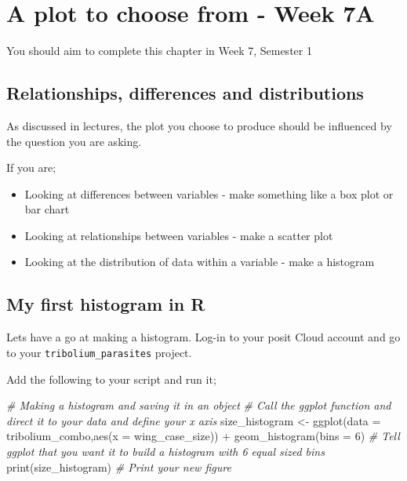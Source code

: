\documentclass[
]{book}
\newenvironment{Shaded}{\begin{snugshade}}{\end{snugshade}}
\newcommand{\AttributeTok}[1]{\textcolor[rgb]{0.77,0.63,0.00}{#1}}
\newcommand{\CommentTok}[1]{\textcolor[rgb]{0.56,0.35,0.01}{\textit{#1}}}
\newcommand{\DecValTok}[1]{\textcolor[rgb]{0.00,0.00,0.81}{#1}}
\newcommand{\FunctionTok}[1]{\textcolor[rgb]{0.00,0.00,0.00}{#1}}
\newcommand{\NormalTok}[1]{#1}
\newcommand{\OtherTok}[1]{\textcolor[rgb]{0.56,0.35,0.01}{#1}}
\newcommand{\SpecialCharTok}[1]{\textcolor[rgb]{0.00,0.00,0.00}{#1}}
\providecommand{\tightlist}{%
  \setlength{\itemsep}{0pt}\setlength{\parskip}{0pt}}
\begin{document}
\hypertarget{histogram}{%
\chapter{A plot to choose from - Week 7A}\label{histogram}}

You should aim to complete this chapter in Week 7, Semester 1

\hypertarget{relationships-differences-and-distributions}{%
\section{Relationships, differences and distributions}\label{relationships-differences-and-distributions}}

As discussed in lectures, the plot you choose to produce should be influenced by the question you are asking.

If you are;

\begin{itemize}
\tightlist
\item
  Looking at differences between variables - make something like a box plot or bar chart
\item
  Looking at relationships between variables - make a scatter plot
\item
  Looking at the distribution of data within a variable - make a histogram
\end{itemize}

\hypertarget{my-first-histogram-in-r}{%
\section{My first histogram in R}\label{my-first-histogram-in-r}}

Lets have a go at making a histogram. Log-in to your posit Cloud account and go to your \texttt{tribolium\_parasites} project.

Add the following to your script and run it;

\begin{Shaded}
\begin{Highlighting}[]
\CommentTok{\# Making a histogram and saving it in an object}
\CommentTok{\# Call the ggplot function and direct it to your data and define your x axis}
\NormalTok{size\_histogram }\OtherTok{\textless{}{-}} \FunctionTok{ggplot}\NormalTok{(}\AttributeTok{data =}\NormalTok{ tribolium\_combo,}\FunctionTok{aes}\NormalTok{(}\AttributeTok{x =}\NormalTok{ wing\_case\_size)) }\SpecialCharTok{+} 
  \FunctionTok{geom\_histogram}\NormalTok{(}\AttributeTok{bins =} \DecValTok{6}\NormalTok{) }\CommentTok{\# Tell ggplot that you want it to build a histogram with 6 equal sized bins}
\FunctionTok{print}\NormalTok{(size\_histogram) }\CommentTok{\# Print your new figure}
\end{Highlighting}
\end{Shaded}
\end{document}
